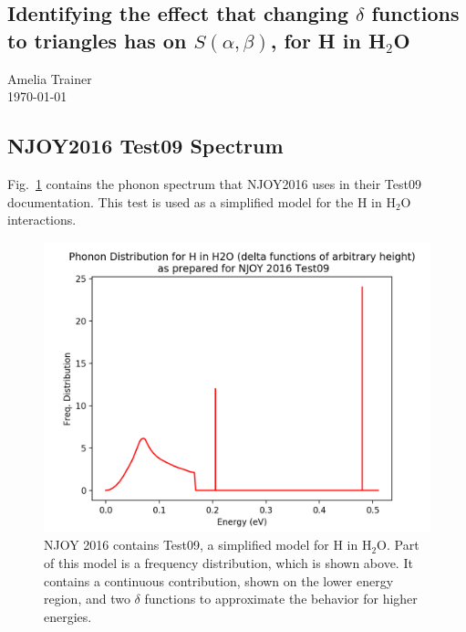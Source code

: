 \documentclass[10pt]{article}
\renewcommand{\title}[1]{\textbf{#1}\\}
\renewcommand{\line}{\begin{tabularx}{\textwidth}{X>{\raggedleft}X}\hline\\\end{tabularx}\\[-0.5cm]}
\newcommand{\leftright}[2]{\begin{tabularx}{\textwidth}{X>{\raggedleft}X}#1%
\end{tabularx}\\[-0.5cm]}
\begin{document}

\begin{center}\section*{Identifying the effect that changing $\delta$ functions to triangles has on $S(\alpha,\beta)$, for H in H$_2$O}

  Amelia Trainer \\
  \today
\end{center}

\begin{multicols}{2}
\subsection*{NJOY2016 Test09 Spectrum}

  Fig.~\ref{fig:waterPhonon} contains the phonon spectrum that NJOY2016 uses in their Test09 documentation. This test is used as a simplified model for the H in H$_2$O interactions. 
            \begin{figure}[H]
              \begin{center}
              \includegraphics[scale=0.5]{waterPhononDist}
                \caption{NJOY 2016 contains Test09, a simplified model for H in H$_2$O. Part of this model is a frequency distribution, which is shown above. It contains a continuous contribution, shown on the lower energy region, and two $\delta$ functions to approximate the behavior for higher energies.}
              \label{fig:waterPhonon}
              \end{center}
            \end{figure}


\end{multicols}
\end{document}
